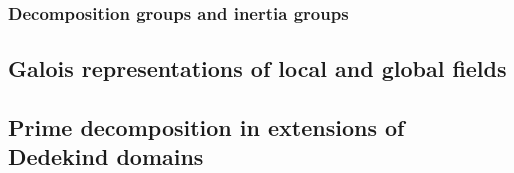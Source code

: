 







\subsubsection{Decomposition groups and inertia groups}














% 

\subsection{Galois representations of local and global fields}







\subsection{Prime decomposition in extensions of Dedekind domains}

